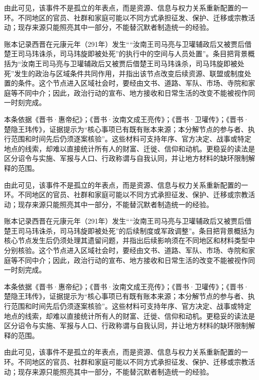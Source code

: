 由此可见，该事件不是孤立的年表点，而是资源、信息与权力关系重新配置的一环。不同地区的官员、社群和家庭可能以不同方式承担征发、保护、迁移或宗教活动；现存来源只能照亮其中一部分，不能替沉默者制造统一的经验。

账本记录西晋在元康元年（291年）发生““汝南王司马亮与卫瓘辅政后又被贾后借楚王司马玮诛杀，司马玮旋即被处死”的执行中的空间与人员处置”。条目把背景概括为“汝南王司马亮与卫瓘辅政后又被贾后借楚王司马玮诛杀，司马玮旋即被处死”发生的政治与区域条件共同作用，并指出该节点改变后续资源、联盟或制度处置的条件。这个节点进入区域社会时，要经由文书、道路、军队、市场、寺院和家庭等不同中介；因此，政治行动的宣布、地方接收和日常生活的改变不能被视作同一时刻完成。

本条依据《晋书·惠帝纪》；《晋书·汝南文成王亮传》；《晋书·卫瓘传》；《晋书·楚隐王玮传》，证据提示为“核心事项已有既有账本来源；本分解节点的参与者、执行范围和时间先后仍须逐案核验”。这些材料可支持年序、官方决定、战事或特定地点的线索，却难以直接统计所有人的财富、迁徙、信仰和动机。更稳妥的读法是区分诏令与实施、军报与人口、行政称谓与自我认同，并让地方材料的缺环限制解释的范围。

由此可见，该事件不是孤立的年表点，而是资源、信息与权力关系重新配置的一环。不同地区的官员、社群和家庭可能以不同方式承担征发、保护、迁移或宗教活动；现存来源只能照亮其中一部分，不能替沉默者制造统一的经验。

账本记录西晋在元康元年（291年）发生““汝南王司马亮与卫瓘辅政后又被贾后借楚王司马玮诛杀，司马玮旋即被处死”的后续制度或军政调整”。条目把背景概括为核心节点发生后仍须处理其遗留问题，并指出后续影响须在不同地区和材料类型中分别核验。这个节点进入区域社会时，要经由文书、道路、军队、市场、寺院和家庭等不同中介；因此，政治行动的宣布、地方接收和日常生活的改变不能被视作同一时刻完成。

本条依据《晋书·惠帝纪》；《晋书·汝南文成王亮传》；《晋书·卫瓘传》；《晋书·楚隐王玮传》，证据提示为“核心事项已有既有账本来源；本分解节点的参与者、执行范围和时间先后仍须逐案核验”。这些材料可支持年序、官方决定、战事或特定地点的线索，却难以直接统计所有人的财富、迁徙、信仰和动机。更稳妥的读法是区分诏令与实施、军报与人口、行政称谓与自我认同，并让地方材料的缺环限制解释的范围。

由此可见，该事件不是孤立的年表点，而是资源、信息与权力关系重新配置的一环。不同地区的官员、社群和家庭可能以不同方式承担征发、保护、迁移或宗教活动；现存来源只能照亮其中一部分，不能替沉默者制造统一的经验。

